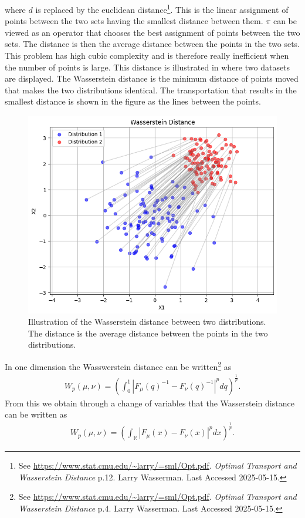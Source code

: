 \documentclass[%
a4paper,							
11pt,								
bibliography=totoc,						
abstracton=true					
]
{scrartcl}
\theoremstyle{plain}
\theoremstyle{definition}
\theoremstyle{remark}
\newcommand{\1}{\mathbbm{1}}
\begin{document}
where $d$ is replaced by the euclidean distance\footnote{See \url{https://www.stat.cmu.edu/~larry/=sml/Opt.pdf}. \textit{Optimal Transport and Wasserstein Distance} p.12. Larry Wasserman. Last Accessed 2025-05-15.}. This is the linear assignment of points between the two sets having the smallest distance between them. $\pi$ can be viewed as an operator that chooses the best assignment of points between the two sets. The distance is then the average distance between the points in the two sets. This problem has high cubic complexity and is therefore really inefficient when the number of points is large. This distance is illustrated in  where two datasets are displayed. The Wasserstein distance is the minimum distance of points moved that makes the two distributions identical. The transportation that results in the smallest distance is shown in the figure as the lines between the points. 
\begin{figure}
    \centering
    \includegraphics[width=0.8\linewidth]{3Theory/pictures/WassersteinIllustrated.png}
    \caption{Illustration of the Wasserstein distance between two distributions. The distance is the average distance between the points in the two distributions.}
    \label{fig:WassersteinDistance}
\end{figure}


In one dimension the Wasswerstein distance can be written\footnote{See \url{https://www.stat.cmu.edu/~larry/=sml/Opt.pdf}. \textit{Optimal Transport and Wasserstein Distance} p.4. Larry Wasserman. Last Accessed 2025-05-15.} as 
\begin{align*}
    W_p(\mu,\nu) = \left(  \int_{0}^1 |F_\mu(q)^{-1} - F_\nu(q)^{-1}|^p dq \right)^{\frac{1}{p}}.
\end{align*}
From this we obtain through a change of variables that the Wasserstein distance can be written as
\begin{align*}
    W_p(\mu,\nu) = \left( \int_{\mathbb{R}} |F_\mu(x) - F_\nu(x)|^p dx \right)^{\frac{1}{p}}. 
\end{align*}
\end{document}

